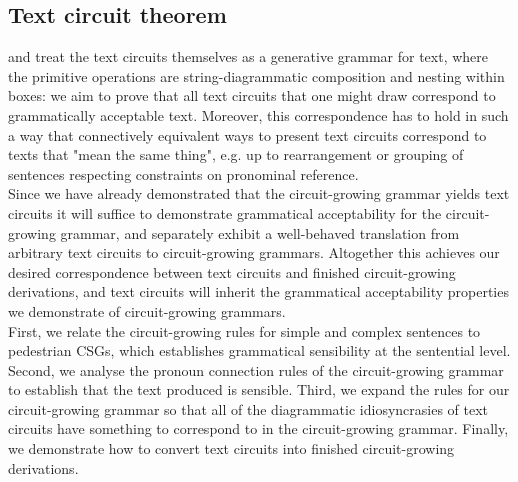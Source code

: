 \subsection{Text circuit theorem}

 and treat the text circuits themselves as a generative grammar for text, where the primitive operations are string-diagrammatic composition and nesting within boxes: we aim to prove that all text circuits that one might draw correspond to grammatically acceptable text. Moreover, this correspondence has to hold in such a way that connectively equivalent ways to present text circuits correspond to texts that "mean the same thing", e.g. up to rearrangement or grouping of sentences respecting constraints on pronominal reference.\\

 Since we have already demonstrated that the circuit-growing grammar yields text circuits it will suffice to demonstrate grammatical acceptability for the circuit-growing grammar, and separately exhibit a well-behaved translation from arbitrary text circuits to circuit-growing grammars. Altogether this achieves our desired correspondence between text circuits and finished circuit-growing derivations, and text circuits will inherit the grammatical acceptability properties we demonstrate of circuit-growing grammars.\\

 First, we relate the circuit-growing rules for simple and complex sentences to pedestrian CSGs, which establishes grammatical sensibility at the sentential level. Second, we analyse the pronoun connection rules of the circuit-growing grammar to establish that the text produced is sensible. Third, we expand the rules for our circuit-growing grammar so that all of the diagrammatic idiosyncrasies of text circuits have something to correspond to in the circuit-growing grammar. Finally, we demonstrate how to convert text circuits into finished circuit-growing derivations.
\clearpage

